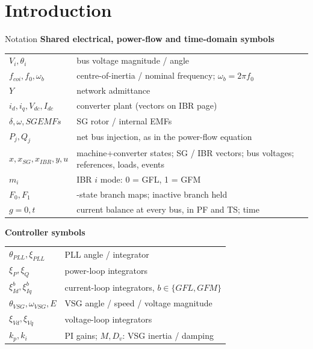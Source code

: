 \documentclass{beamer}
\begin{document}
\section{Introduction}
\begin{frame}{Notation}
\fontsize{7}{8}\selectfont
\renewcommand{\arraystretch}{1.12}\setlength{\tabcolsep}{3pt}
\textbf{Shared electrical, power-flow and time-domain symbols}\par\smallskip
\begin{tabular}{@{}p{3.1cm}>{\raggedright\arraybackslash}p{7.4cm}@{}}
$V_i,\theta_i$ & bus voltage magnitude / angle\\
$f_{coi},f_0,\omega_b$ & centre-of-inertia / nominal frequency; $\omega_b=2\pi f_0$\\
$Y$ & network admittance\\
	$i_d,i_q,V_{dc},I_{dc}$ & converter plant (vectors on IBR page)\\
	$\delta,\omega,SG EMFs$ & SG rotor / internal EMFs\\
$P_j,Q_j$ & net bus injection, as in the power-flow equation\\
$x,x_{SG},x_{IBR},y,u$ & machine+converter states; SG / IBR vectors; bus voltages; references, loads, events\\
$m_i$ & IBR $i$ mode: 0 = GFL, 1 = GFM\\
$F_0,F_1$ & 17-state branch maps; inactive branch held\\
$g=0,t$ & current balance at every bus, in PF and TS; time\\
\end{tabular}\par\medskip
\textbf{Controller symbols}\par\smallskip
\begin{tabular}{@{}p{3.1cm}>{\raggedright\arraybackslash}p{7.4cm}@{}}
$\theta_{PLL},\xi_{PLL}$ & PLL angle / integrator\\
$\xi_P,\xi_Q$ & power-loop integrators\\
$\xi_{Id}^{b},\xi_{Iq}^{b}$ & current-loop integrators, $b\in\{GFL,GFM\}$\\
$\theta_{VSG},\omega_{VSG},E$ & VSG angle / speed / voltage magnitude\\
$\xi_{Vd},\xi_{Vq}$ & voltage-loop integrators\\
$k_p,k_i$ & PI gains; $M,D_v$: VSG inertia / damping\\
\end{tabular}
\end{frame}
\end{document}
